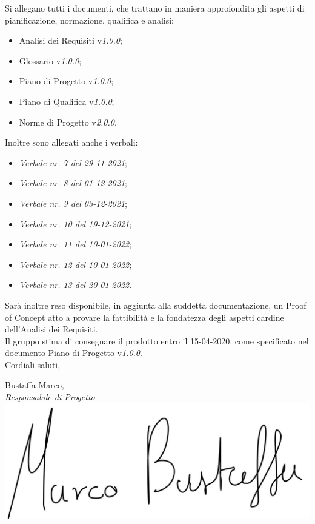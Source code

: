 \documentclass[a4paper, 12pt]{letter}
\begin{document}
\begin{letter}
        Si allegano tutti i documenti, che trattano in maniera approfondita gli aspetti di pianificazione, normazione, qualifica e analisi:
        \begin{itemize}
        	\item Analisi dei Requisiti v\textit{1.0.0};
            \item Glossario v\textit{1.0.0};
            \item Piano di Progetto v\textit{1.0.0};
            \item Piano di Qualifica v\textit{1.0.0};
            \item Norme di Progetto v\textit{2.0.0}.
        \end{itemize}
        Inoltre sono allegati anche i verbali:
        \begin{itemize}
            \item \textit{Verbale nr. 7 del 29-11-2021};
            \item \textit{Verbale nr. 8 del 01-12-2021};
            \item \textit{Verbale nr. 9 del 03-12-2021};
            \item \textit{Verbale nr. 10 del 19-12-2021};
            \item \textit{Verbale nr. 11 del 10-01-2022};
            \item \textit{Verbale nr. 12 del 10-01-2022};
            \item \textit{Verbale nr. 13 del 20-01-2022}.
        \end{itemize}
        Sarà inoltre reso disponibile, in aggiunta alla suddetta documentazione, un Proof of Concept atto a provare la fattibilità e la fondatezza degli aspetti cardine dell'Analisi dei Requisiti. \\
        Il gruppo stima di consegnare il prodotto entro il 15-04-2020, come specificato nel documento Piano di Progetto v\textit{1.0.0}.\\

        Cordiali saluti,
        \begin{flushright}
        	\closing{Bustaffa Marco, \\ \textit{Responsabile di Progetto} \\ \includegraphics[scale=0.10]{../../assets/firma.jpg}} 
        \end{flushright}
    \end{letter}
\end{document}
